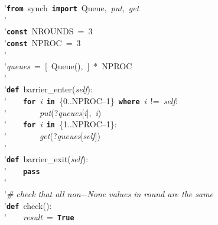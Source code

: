 \'\>\texttt{\textbf{from}}~synch~\texttt{\textbf{import}}~Queue,~\textit{put},~\textit{get}\\

\'\>\\

\'\>\texttt{\textbf{const}}~NROUNDS~=~3\\

\'\>\texttt{\textbf{const}}~NPROC~=~3\\

\'\>\\

\'\>\textit{queues}~=~[~Queue(),~]~*~NPROC\\

\'\>\\

\'\>\texttt{\textbf{def}}~barrier\_enter(\textit{self}):\\

\'\>~~~~\texttt{\textbf{for}}~\textit{i}~\texttt{\textbf{in}}~\{0..NPROC--1\}~\texttt{\textbf{where}}~\textit{i}~!=~\textit{self}:\\

\'\>~~~~~~~~\textit{put}(?\textit{queues}[\textit{i}],~\textit{i})\\

\'\>~~~~\texttt{\textbf{for}}~\textit{i}~\texttt{\textbf{in}}~\{1..NPROC--1\}:\\

\'\>~~~~~~~~\textit{get}(?\textit{queues}[\textit{self}])\\

\'\>\\

\'\>\texttt{\textbf{def}}~barrier\_exit(\textit{self}):\\

\'\>~~~~\texttt{\textbf{pass}}\\

\'\>\\

\'\>\emph{\# check that all non$-$None values in round are the same}\\

\'\>\texttt{\textbf{def}}~check():\\

\'\>~~~~\textit{result}~=~\texttt{\textbf{True}}\\

